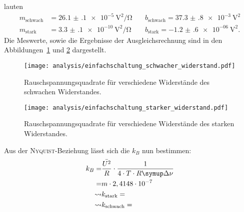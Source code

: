lauten
%
\begin{align*}
  m_\text{schwach}&=\SI{26.1(1)e-5}{\volt\squared\per\ohm} \quad &b_\text{schwach}=\SI{37.3(8)e-3}{\volt\squared} \\ m_\text{stark}&=\SI{3.3(1)e-10}{\volt\squared\per\ohm} \quad &b_\text{stark}=\SI{-1.2(6)e-06}{\volt\squared}.
\end{align*}
%
Die Meswerte, sowie die Ergebnisse der Ausgleichsrechnung sind in den Abbildungen~\ref{fig:r_schwach} und \ref{fig:r_stark} dargestellt.
%
\begin{figure}
  \texttt{[image: analysis/einfachschaltung\_schwacher\_widerstand.pdf]}
  \caption{Rauschspannungsquadrate für verschiedene Widerstände des schwachen Widerstandes.}
  \label{fig:r_schwach}
\end{figure}
%
%
\begin{figure}
  \texttt{[image: analysis/einfachschaltung\_starker\_widerstand.pdf]}
  \caption{Rauschspannungsquadrate für verschiedene Widerstände des starken Widerstandes.}
  \label{fig:r_stark}
\end{figure}
%

Aus der \textsc{Nyquist}-Beziehung lässt sich die $k_B$ nun bestimmen:
%
\begin{align*}
  k_B=&\frac{\bar{U^2}}{R}\cdot\frac{1}{4\cdot T\cdot R\upD\nu} \\
     =&m\cdot2,4148\cdot10^{-7} \\
  \leadsto &k_\text{stark}= \\
  \leadsto &k_\text{schwach}=
\end{align*}

